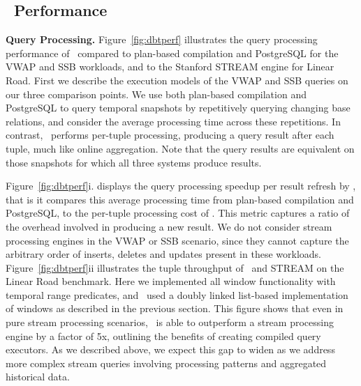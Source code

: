 \subsection{\compiler\ Performance}

\textbf{Query Processing.}
Figure~\ref{fig:dbtperf} illustrates the query processing performance of
\compiler\ compared to plan-based compilation and PostgreSQL for the VWAP and SSB
workloads, and to the Stanford STREAM engine for Linear Road. First we describe
the execution models of the VWAP and SSB queries on our three comparison points.
We use both plan-based compilation and PostgreSQL to query temporal snapshots by
repetitively querying changing base relations, and consider the average
processing time across these repetitions. In contrast, \compiler\ performs
per-tuple processing, producing a query result after each tuple, much like online
aggregation. Note that the query results are equivalent on those snapshots for
which all three systems produce results.

Figure~\ref{fig:dbtperf}i. displays the query processing speedup per result
refresh by \compiler, that is it compares this average processing time from
plan-based compilation and PostgreSQL, to the per-tuple processing cost of
\compiler. This metric captures a ratio of the overhead involved in producing a
new result. We do not consider stream processing engines in the VWAP or SSB
scenario, since they cannot capture the arbitrary order of inserts, deletes and
updates present in these workloads.
Figure~\ref{fig:dbtperf}ii illustrates the tuple throughput of \compiler\ and
STREAM on the Linear Road benchmark. Here we implemented all window functionality
with temporal range predicates, and \compiler\ used a doubly linked list-based
implementation of windows as described in the previous section. This figure shows
that even in pure stream processing scenarios, \compiler\ is able to outperform a
stream processing engine by a factor of 5x, outlining the benefits of creating
compiled query executors. As we described above, we expect this gap to widen as
we address more complex stream queries involving processing patterns and
aggregated historical data.



